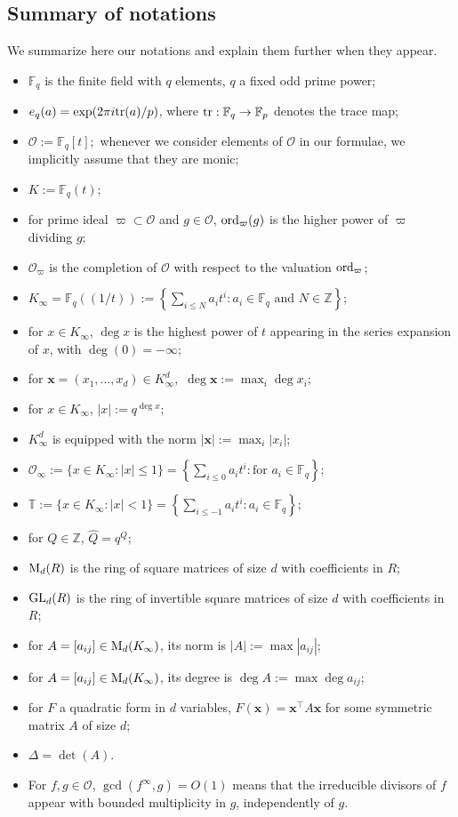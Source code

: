 \documentclass[10pt]{amsart}
\theoremstyle{plain}
\theoremstyle{plain}
\renewcommand{\vec}[1]{\mathbf{#1}}
\theoremstyle{remark}
\theoremstyle{definition}
\newcommand{\ord}{\textup{ord}}
\newcommand{\tr}{\textup{tr}}
\renewcommand{\hat}{\widehat}
\newcommand{\Ki}{K_\infty}
\newcommand{\GL}{\textup{GL}}
\newcommand{\FF}{\mathbb{F}}
\newcommand{\ZZ}{\mathbb{Z}}
\begin{document}
\subsection{Summary of notations}\label{Summaryofnot}
We summarize here our notations and explain them further when they appear. 
\begin{itemize}
\item $\mathbb{F}_q$ is the finite field with $q$ elements, $q$ a fixed odd prime power;
\item $e_q(a)=\exp(2\pi i \tr(a)/p)$, where $\tr: \FF_q\rightarrow \FF_p$ denotes the trace map;
\item $\mathcal{O}:=\mathbb{F}_q[t];$ whenever we consider elements of $\mathcal{O}$ in our formulae, we implicitly assume that they are monic;
\item $K:=\mathbb{F}_q(t);$
\item for prime ideal $\varpi\subset\mathcal{O}$ and $g\in\mathcal{O}$, $\ord_{\varpi}(g)$ is the higher power of $\varpi$ dividing $g$;
\item $\mathcal{O}_{\varpi}$ is the completion of $\mathcal{O}$ with respect to the valuation $\ord_{\varpi}$;
\item $\Ki=\mathbb{F}_q(\!(1/t)\!):=\left\{\sum_{i\leq N}a_it^i: \mbox{$a_i\in \FF_q$ and $N\in\ZZ$} \right\};$
\item for $x\in \Ki$, $\deg x$ is the highest power of $t$ appearing in  the series expansion of $x$, with $\deg(0)=-\infty;$ 
\item for $\vec{x}=(x_1,\hdots,x_d)\in \Ki^d,$ $\deg\vec{x} :=\max_i \deg x_i;$ 
\item for $x\in \Ki$, $|x|:=q^{\deg x};$
\item $K_{\infty}^d$ is equipped  with the norm $|\vec{x}|:=\max_i|x_i|$;
\item $\mathcal{O}_{\infty}:=\{x\in\Ki:|x|\leq 1\}=\left\{\sum_{i\leq 0}a_it^i: \mbox{for $a_i\in \FF_q$} \right\};$
\item $\mathbb{T}:=\{x\in\Ki:|x|<1\}=\left\{\sum_{i\leq -1}a_it^i: \mbox{$a_i\in \FF_q$} \right\};$
\item for $Q\in\mathbb{Z}$, $\hat{Q}=q^Q;$
\item $\textup{M}_d(R)$ is the ring of square matrices of size $d$ with coefficients in $R$;
\item $\GL_d(R)$ is the ring of invertible square matrices of size $d$ with coefficients in $R$;
\item for $A=[a_{ij}]\in\textup{M}_d(\Ki)$, its norm is $|A|:=\max|a_{ij}|$;
\item for $A=[a_{ij}]\in\textup{M}_d(\Ki)$, its degree is $\deg A:=\max \deg a_{ij}$;
\item for $F$ a quadratic form in $d$ variables, $F(\vec{x})=\vec{x}^{\intercal}A\vec{x}$ for some symmetric matrix $A$ of size $d$; 
\item $\Delta=\det(A).$
\item For $f,g\in\mathcal{O}$, $\gcd(f^{\infty},g)=O(1)$ means that the irreducible divisors of $f$ appear with bounded multiplicity in $g$, independently of $g$.
\end{itemize}
\end{document}
